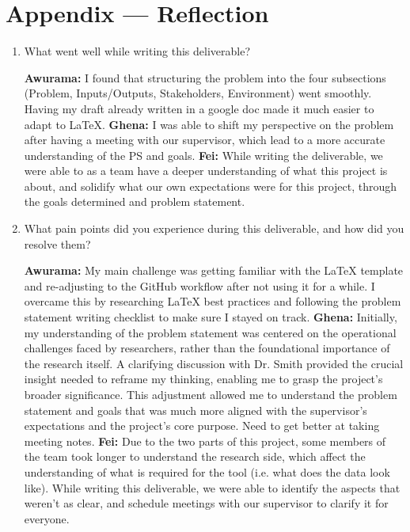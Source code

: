 \documentclass{article}
\begin{document}
\newpage{}

\section*{Appendix --- Reflection}


% 

\begin{enumerate}
    \item What went well while writing this deliverable? 
    
    \textbf{Awurama:} I found that structuring the problem into the four subsections 
    (Problem, Inputs/Outputs, Stakeholders, Environment) went smoothly. Having my 
    draft already written in a google doc made it much easier to adapt to LaTeX. 
    \textbf{Ghena:} I was able to shift my perspective on the problem after having a meeting with our supervisor, which lead to a more accurate understanding of the PS and goals.
    \textbf{Fei:} While writing the deliverable, we were able to as a team have a deeper understanding of what this project is about, and solidify what our own expectations were for this project, through the goals determined and problem statement.

    \item What pain points did you experience during this deliverable, and how
    did you resolve them?

    \textbf{Awurama:} My main challenge was getting familiar with the LaTeX template 
    and re-adjusting to the GitHub workflow after not using it for a while. I overcame this 
    by researching LaTeX best practices and following the problem statement writing checklist 
    to make sure I stayed on track.  
    \textbf{Ghena:} Initially, my understanding of the problem statement was centered on the operational challenges faced by researchers, rather than the foundational importance of the research itself. A clarifying discussion with Dr. Smith provided the crucial insight needed to reframe my thinking, enabling me to grasp the project's broader significance. This adjustment allowed me to understand the problem statement and goals that was much more aligned with the supervisor's expectations and the project's core purpose. Need to get better at taking meeting notes.
    \textbf{Fei:} Due to the two parts of this project, some members of the team took longer to understand the research side, which affect the understanding of what is required for the tool (i.e. what does the data look like). While writing this deliverable, we were able to identify the aspects that weren’t as clear, and schedule meetings with our supervisor to clarify it for everyone. 
    

\end{enumerate}
\end{document}
